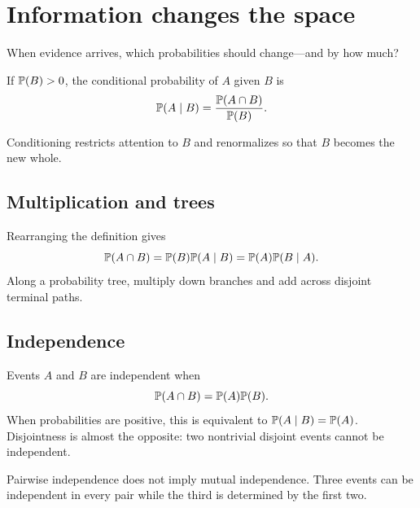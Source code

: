 \chapter{Information changes the space}

\begin{question}
When evidence arrives, which probabilities should change---and by how much?
\end{question}

\begin{definition}
If $\P(B)>0$, the conditional probability of $A$ given $B$ is
\[
\P(A\mid B)=\frac{\P(A\cap B)}{\P(B)}.
\]
\end{definition}

Conditioning restricts attention to $B$ and renormalizes so that $B$ becomes the new whole.

\begin{center}
\end{center}

\section{Multiplication and trees}

Rearranging the definition gives
\[
\P(A\cap B)=\P(B)\P(A\mid B)=\P(A)\P(B\mid A).
\]
Along a probability tree, multiply down branches and add across disjoint terminal paths.

\section{Independence}

Events $A$ and $B$ are independent when
\[
\P(A\cap B)=\P(A)\P(B).
\]
When probabilities are positive, this is equivalent to $\P(A\mid B)=\P(A)$. Disjointness is almost the opposite: two nontrivial disjoint events cannot be independent.

\begin{warningbox}
Pairwise independence does not imply mutual independence. Three events can be independent in every pair while the third is determined by the first two.
\end{warningbox}

